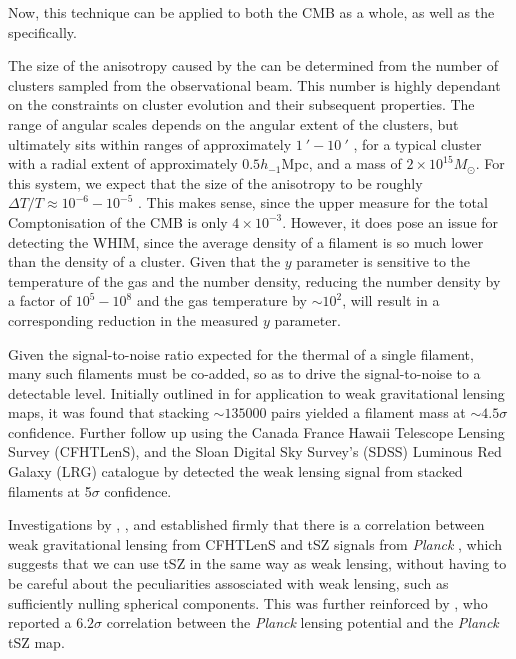 Now, this technique can be applied to both the CMB as a whole, as well as the \sze specifically.  


The size of the anisotropy caused by the \sze can be determined from the number of clusters sampled from the observational beam. This number is highly dependant on the constraints on cluster evolution and their subsequent properties. The range of angular scales depends on the angular extent of the clusters, but ultimately sits within ranges of approximately $\SI{1}{\arcmin} - \SI{10}{\arcmin}$ , for a typical cluster with a radial extent of approximately $0.5 h_{-1} $Mpc, and a mass of $2\times 10^{15} M_\odot$. For this system, we expect that the size of the anisotropy to be roughly $\Delta T/T \approx 10^{-6} - 10^{-5}$ \citep{1995ARA&A..33..541R}. This makes sense, since the upper measure for the total Comptonisation of the CMB is only $4\times 10^{-3}$. However, it does pose an issue for detecting the WHIM, since the average density of a filament is so much lower than the density of a cluster. Given that the $y$ parameter is sensitive to the temperature of the gas and the number density, reducing the number density by a factor of $10^5-10^8$ and the gas temperature by $\sim 10^2$, will result in a corresponding reduction in the measured $y$ parameter. 

Given the signal-to-noise ratio expected for the thermal \sze of a single filament, many such filaments must be co-added, so as to drive the signal-to-noise to a detectable level. Initially outlined in \cite{2016MNRAS.457.2391C} for application to weak gravitational lensing maps, it was found that stacking $\sim 135 000$ pairs yielded a filament mass at $\sim 4.5 \sigma$ confidence. Further follow up using the Canada France Hawaii Telescope Lensing Survey (CFHTLenS), and the Sloan Digital Sky Survey's (SDSS) Luminous Red Galaxy (LRG) catalogue by \cite{2017MNRAS.468.2605E} detected the weak lensing signal from stacked filaments at 5$\sigma$ confidence.

Investigations by \cite{2014PhRvD..89b3508V}, \cite{2015JCAP...09..046M}, and \cite{2015JCAP...10..047H} established firmly that there is a correlation between weak gravitational lensing from CFHTLenS and tSZ signals from \emph{Planck} , which suggests that we can use tSZ in the same way as weak lensing, without having to be careful about the peculiarities assosciated with weak lensing, such as sufficiently nulling spherical components. This was further reinforced by \cite{2014JCAP...02..030H}, who reported a $6.2 \sigma$ correlation between the \emph{Planck}  lensing potential and the \emph{Planck}  tSZ map. 
